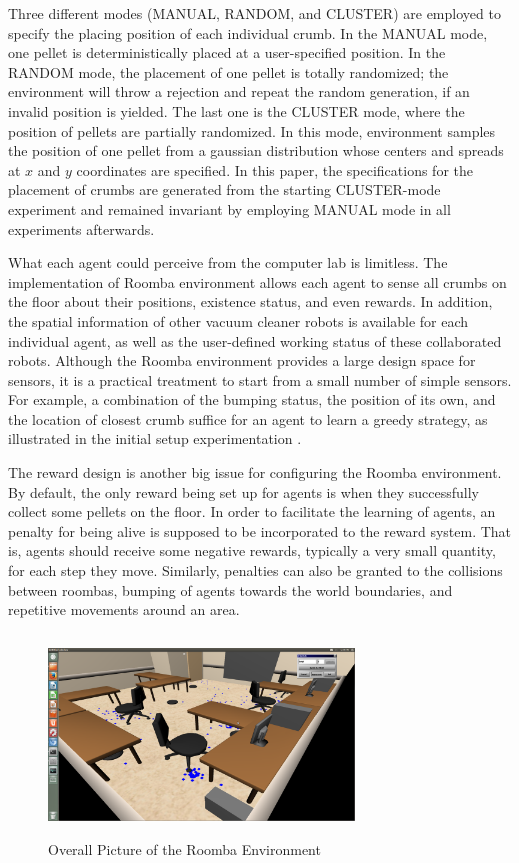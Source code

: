 \documentclass[conference]{IEEEtran}
\begin{document}
Three different modes (MANUAL, RANDOM, and CLUSTER) are employed to specify
the placing position of each individual crumb.
In the MANUAL mode, one pellet is deterministically placed at a user-specified
position. 
In the RANDOM mode, the placement of one pellet is totally randomized; the
environment will throw a rejection and repeat the random generation, if an
invalid position is yielded. The last one is the CLUSTER mode, where the
position of pellets are partially randomized. In this mode,
environment samples the position of one pellet from a gaussian distribution
whose centers and spreads at $x$ and $y$ coordinates are specified. 
In this paper, the specifications for the placement of crumbs are generated
from the starting CLUSTER-mode experiment and remained invariant by
employing MANUAL mode in all experiments afterwards.

What each agent could perceive from the computer lab is limitless. 
The implementation of Roomba environment allows each agent to sense all crumbs on
the floor about their positions, existence status, and even rewards. In
addition, the spatial information of other vacuum cleaner robots is available
for each individual agent, as well as the user-defined working status of these 
collaborated robots. Although the Roomba environment provides a large design
space for sensors, it is a practical treatment to start from a small number of
simple sensors. For example, a combination of the bumping status, the position of
its own, and the location of closest crumb suffice for an agent to learn a
greedy strategy, as illustrated in the initial setup experimentation .

The reward design is another big issue for
configuring the Roomba environment. By default, the only reward being set up
for agents is when they successfully collect some pellets on the floor. In
order to facilitate the learning of agents, an penalty for being alive is
supposed to be incorporated to the reward system. That is, agents should
receive some negative rewards, typically a very small quantity, for each step
they move. Similarly, penalties can also be granted to the collisions between
roombas, bumping of agents towards the world boundaries, and repetitive
movements around an area.

\begin{figure}[!t]
\centering
\includegraphics[width=3.2in,height=2.1in]{./figures/roombas/roomba2.png}
\caption{Overall Picture of the Roomba Environment}
\label{roomba:world}
\end{figure}
\end{document}
